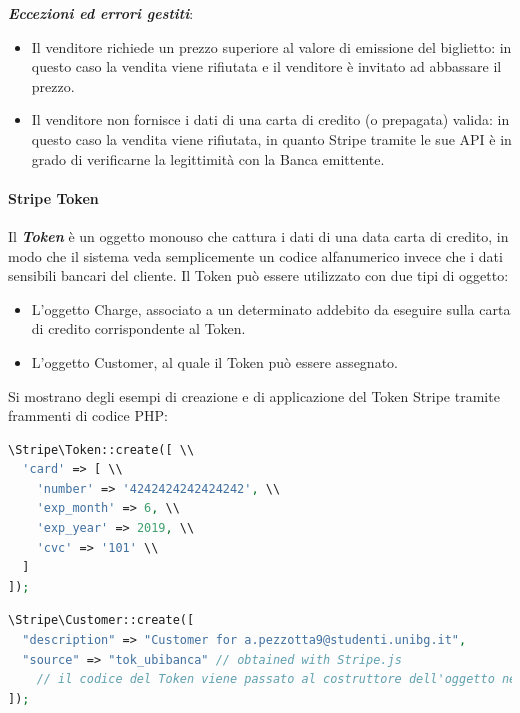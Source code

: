 \textbf{\textit{Eccezioni ed errori gestiti}}:
\begin{itemize}
\item Il venditore richiede un prezzo superiore al valore di emissione del biglietto: in questo caso la vendita viene rifiutata e il venditore è invitato ad abbassare il prezzo.
\item Il venditore non fornisce i dati di una carta di credito (o prepagata) valida: in questo caso la vendita viene rifiutata, in quanto Stripe tramite le sue API è in grado di verificarne la legittimità con la Banca emittente. 
\end{itemize}
\paragraph{Stripe Token}
Il \textit{\textbf{Token}} è un oggetto monouso che cattura i dati di una data carta di credito, in modo che il sistema veda semplicemente un codice alfanumerico invece che i dati sensibili bancari del cliente. Il Token può essere utilizzato con due tipi di oggetto: 
\begin{itemize}
\item L'oggetto Charge, associato a un determinato addebito da eseguire sulla carta di credito corrispondente al Token.
\item L'oggetto Customer, al quale il Token può essere assegnato.
\end{itemize}
Si mostrano degli esempi di creazione e di applicazione del Token Stripe tramite frammenti di codice PHP: 
\begin{lstlisting}[language=PHP, caption={Creazione di un Token associato alla carta di credito indicata nell'array di nome card}]
\Stripe\Token::create([ \\
  'card' => [ \\
    'number' => '4242424242424242', \\
    'exp_month' => 6, \\
    'exp_year' => 2019, \\
    'cvc' => '101' \\
  ]
]);
\end{lstlisting}
\begin{lstlisting}[language=PHP, caption={creazione di un oggetto Customer, che verrà poi utilizzato per gestire pagamenti e vendite sul portale Equiticket}]
\Stripe\Customer::create([
  "description" => "Customer for a.pezzotta9@studenti.unibg.it",
  "source" => "tok_ubibanca" // obtained with Stripe.js
	// il codice del Token viene passato al costruttore dell'oggetto nella variabile "source"
]);
\end{lstlisting}

